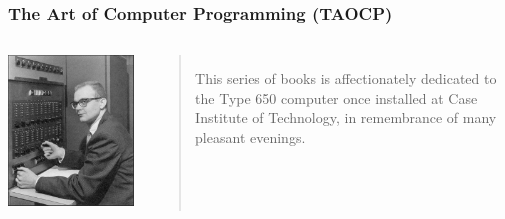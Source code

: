 \documentclass[10pt]{beamer}
\begin{document}
\begin{frame}
  \frametitle{The Art of Computer Programming (TAOCP)}
  \begin{columns}[c]
      \includegraphics[width=1\textwidth]{./media/Don-Knuth-ibm-650-1958.jpg}
        \begin{quote}
This series of books is affectionately dedicated to the Type 650 computer once installed at Case Institute of Technology, in remembrance of many pleasant evenings.\cite{Knuth1973Art}
        \end{quote}

  \end{columns}
\end{frame}

\end{document}
